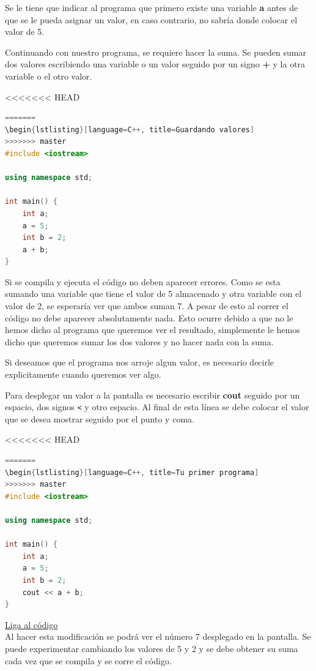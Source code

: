 \documentclass{article}
\begin{document}
Se le tiene que indicar al programa que primero existe una variable \textbf{a} antes de que se le pueda asignar un valor, en caso contrario, no sabría donde colocar el valor de 5.

Continuando con nuestro programa, se requiere hacer la suma. Se pueden sumar dos valores escribiendo una variable o un valor seguido por un signo \textbf{+} y la otra variable o el otro valor.

<<<<<<< HEAD
\begin{lstlisting}[language=C++, title=¿La suma?]
=======
\begin{lstlisting}[language=C++, title=Guardando valores]
>>>>>>> master
#include <iostream>

using namespace std;

int main() {
	int a;
	a = 5;
	int b = 2;
	a + b;
}
\end{lstlisting}

Si se compila y ejecuta el código no deben aparecer errores. Como se esta sumando una variable que tiene el valor de 5 almacenado y otra variable con el valor de 2, se esperaría ver que ambos suman 7. A pesar de esto al correr el código no debe aparecer absolutamente nada. Esto ocurre debido a que no le hemos dicho al programa que queremos ver el resultado, simplemente le hemos dicho que queremos sumar los dos valores y no hacer nada con la suma.

Si deseamos que el programa nos arroje algun valor, es necesario decirle explicitamente cuando queremos ver algo.

Para desplegar un valor a la pantalla es necesario escribir \textbf{cout} seguido por un espacio, dos signos \lstinline{<} y otro espacio. Al final de esta línea se debe colocar el valor que se desea mostrar seguido por el punto y coma.

<<<<<<< HEAD
\begin{lstlisting}[language=C++, title=La suma]
=======
\begin{lstlisting}[language=C++, title=Tu primer programa]
>>>>>>> master
#include <iostream>

using namespace std;

int main() {
	int a;
	a = 5;
	int b = 2;
	cout << a + b;
}
\end{lstlisting}
\href{https://repl.it/@Jamesscn/Mi-primer-programa}{Liga al código}\\

Al hacer esta modificación se podrá ver el número 7 desplegado en la pantalla. Se puede experimentar cambiando los valores de 5 y 2 y se debe obtener su suma cada vez que se compila y se corre el código.
\end{document}
